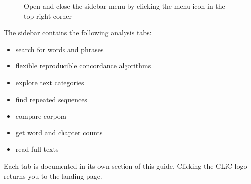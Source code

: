 \documentclass[letterpaper,10pt,english]{sphinxmanual}
\begin{document}
\begin{figure}[htbp]
\centering
\capstart

\noindent{}
\caption{Open and close the sidebar menu by clicking the menu icon in
the top right corner}\label{\detokenize{introduction:id3}}\label{\detokenize{introduction:figure-landing-page-menu}}\end{figure}

\sphinxAtStartPar
The sidebar contains the following analysis tabs:
\begin{itemize}
\item {} 
\sphinxAtStartPar
{} \textendash{} search for words and phrases

\item {} 
\sphinxAtStartPar
{} \textendash{} flexible reproducible concordance algorithms

\item {} 
\sphinxAtStartPar
{} \textendash{} explore text categories

\item {} 
\sphinxAtStartPar
{} \textendash{} find repeated sequences

\item {} 
\sphinxAtStartPar
{} \textendash{} compare corpora

\item {} 
\sphinxAtStartPar
{} \textendash{} get word and chapter counts

\item {} 
\sphinxAtStartPar
{} \textendash{} read full texts

\end{itemize}

\sphinxAtStartPar
Each tab is documented in its own section of this guide. Clicking the
CLiC logo returns you to the landing page.
\end{document}
